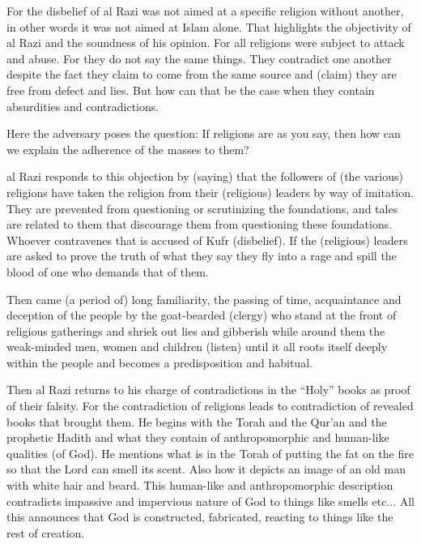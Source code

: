\documentclass[12pt]{book}
\begin{document}

For the disbelief of al Razi was not aimed at a specific religion
without another, in other words it was not aimed at Islam alone.
That highlights the objectivity of al Razi and the soundness of his opinion.
For all religions were subject to attack and abuse.
For they do not say the same things.
They contradict one another despite the fact they claim to come from the same
source and (claim) they are free from defect and lies.
But how can that be the case when they contain absurdities and contradictions.

Here the adversary poses the question: If religions are as you say,
then how can we explain the adherence of the masses to them?

al Razi responds to this objection by (saying) that the followers of
(the various) religions have taken the religion from their
(religious) leaders by way of imitation.
They are prevented from questioning or scrutinizing the foundations,
and tales are related to them that discourage them
from questioning these foundations.
Whoever contravenes that is accused of Kufr (disbelief).
If the (religious) leaders are asked to prove the truth of what they say
they fly into a rage and spill the blood of one who demands that of them.

Then came (a period of) long familiarity, the passing of time,
acquaintance and deception of the people by the goat-bearded (clergy)
who stand at the front of religious gatherings and shriek out
lies and gibberish while around them the weak-minded men, women and children
(listen) until it all roots itself deeply within the people and
becomes a predisposition and habitual.\footnotemark


Then al Razi returns to his charge of contradictions in the “Holy” books
as proof of their falsity.
For the contradiction of religions leads to contradiction of
revealed books that brought them.
He begins with the Torah and the Qur’an and the prophetic Hadith and
what they contain of anthropomorphic and human-like qualities (of God).
He mentions what is in the Torah of putting the fat on the fire
so that the Lord can smell its scent.
Also how it depicts an image of an old man with white hair and beard.
This human-like and anthropomorphic description contradicts impassive and
impervious nature of God to things like smells etc...
All this announces that God is constructed, fabricated,
reacting to things like the rest of creation.
\end{document}
